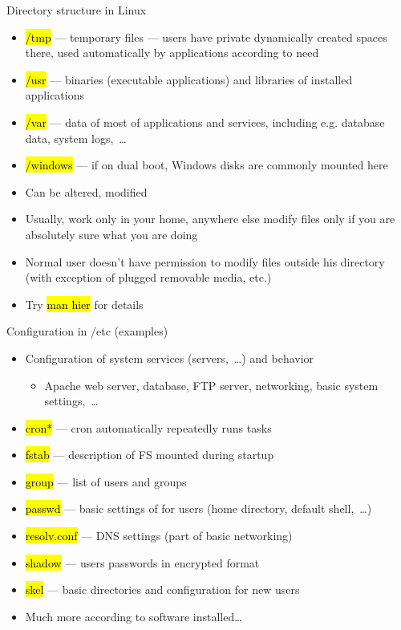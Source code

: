 \documentclass[compress, ucs, xelatex, 11pt, xcolor=svgnames,
  hyperref={
    bookmarks=true,
    unicode=true,
    colorlinks=true,
    pdftitle={Linux, command line and MetaCentrum},
    plainpages=false,
    pdfauthor={Vojtech Zeisek},
    pdfsubject={Course about use of Linux command line, writing shell scripts and using MetaCentrum of CESNET},
    pdfcreator={XeLaTeX},
    pdfkeywords={Linux, GNU, BASH, shell, command line, MetaCentrum},
    linkcolor=DarkRed,
    anchorcolor=DarkBlue,
    citecolor=Indigo,
    filecolor=NavyBlue,
    menucolor=DarkMagenta,
    urlcolor=DarkBlue,
    pdftex},
  url={hyphens, lowtilde} %
  ]{beamer}
\renewcommand{\texttt}[1]{\hl{\ttfamily #1}}
\renewcommand{\alert}[1]{\textcolor{red}{#1}}
\begin{document}
\begin{frame}[allowframebreaks]{Directory structure in Linux}
\begin{itemize}
    \item \texttt{/tmp} --- temporary files --- users have private dynamically created spaces there, used automatically by applications according to need
    \item \texttt{/usr} --- binaries (executable applications) and libraries of installed applications
    \item \alert{\texttt{/var}} --- data of most of applications and services, including e.g. database data, system logs,~\ldots
    \item \alert{\texttt{/windows}} --- if on dual boot, Windows disks are commonly mounted here
    \item Can be altered, modified
    \item Usually, work only in your home, anywhere else modify files only if you are absolutely sure what you are doing
    \item Normal user doesn't have permission to modify files outside his directory (with exception of plugged removable media, etc.)
    \item Try \texttt{man hier} for details
  \end{itemize}
\end{frame}

\begin{frame}{Configuration in /etc (examples)}
  \begin{itemize}
    \item Configuration of system services (servers,~\ldots) and behavior
    \begin{itemize}
      \item Apache web server, database, FTP server, networking, basic system settings,~\ldots
    \end{itemize}
    \item \texttt{cron*} --- cron automatically repeatedly runs tasks
    \item \texttt{fstab} --- description of FS mounted during startup
    \item \texttt{group} --- list of users and groups
    \item \texttt{passwd} --- basic settings of for users (home directory, default shell,~\ldots)
    \item \texttt{resolv.conf} ---  DNS settings (part of basic networking)
    \item \texttt{shadow} --- users passwords in encrypted format
    \item \texttt{skel} --- basic directories and configuration for new users
    \item Much more according to software installed\ldots
  \end{itemize}
\end{frame}
\end{document}
